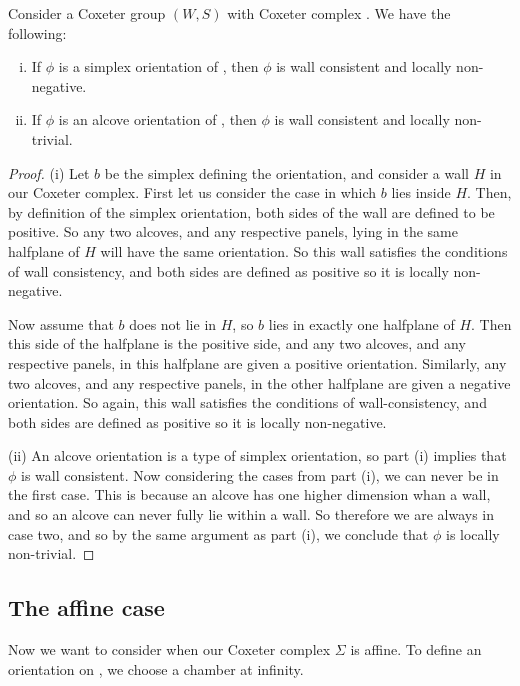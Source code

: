 \documentclass[11pt]{article}
\begin{document}
\begin{lemma}
    Consider a Coxeter group $(W,S)$ with Coxeter complex \sg. We have the following:
    \begin{enumerate}[(i)]
        \item If $\phi$ is a simplex orientation of \sg, then $\phi$ is wall consistent and locally non-negative.
        \item If $\phi$ is an alcove orientation of \sg, then $\phi$ is wall consistent and locally non-trivial.
    \end{enumerate}
\end{lemma}

\begin{proof}
    (i) Let $b$ be the simplex defining the orientation, and consider a wall $H$ in our Coxeter complex. First let us consider the case in which $b$ lies inside $H$. Then, by definition of the simplex orientation, both sides of the wall are defined to be positive. So any two alcoves, and any respective panels, lying in the same halfplane of $H$ will have the same orientation. So this wall satisfies the conditions of wall consistency, and both sides are defined as positive so it is locally non-negative. 
    
    Now assume that $b$ does not lie in $H$, so $b$ lies in exactly one halfplane of $H$. Then this side of the halfplane is the positive side, and any two alcoves, and any respective panels, in this halfplane are given a positive orientation. Similarly, any two alcoves, and any respective panels, in the other halfplane are given a negative orientation. So again, this wall satisfies the conditions of wall-consistency, and both sides are defined as positive so it is locally non-negative. 

    (ii) An alcove orientation is a type of simplex orientation, so part (i) implies that $\phi$ is wall consistent. Now considering the cases from part (i), we can never be in the first case. This is because an alcove has one higher dimension whan a wall, and so an alcove can never fully lie within a wall. So therefore we are always in case two, and so by the same argument as part (i), we conclude that $\phi$ is locally non-trivial. 
\end{proof}

\subsection{The affine case}

Now we want to consider when our Coxeter complex $\Sigma$ is affine. To define an orientation on \sg, we choose a chamber at infinity.
\end{document}
